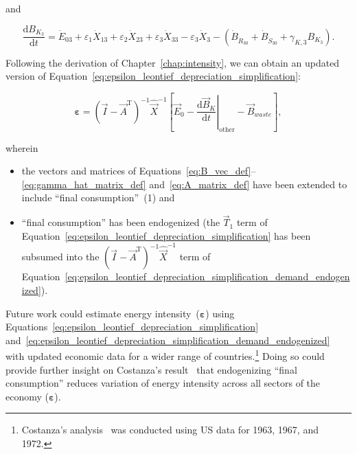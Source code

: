 \noindent{}and

\begin{equation} \label{eq:C-Total_Energy_Sec_3-unfinished}
	\frac{\mathrm{d}B_{K_{3}}}{\mathrm{d}t}
	= \dot{E}_{03}
	+ \varepsilon_{1} \dot{X}_{13}
	+ \varepsilon_{2} \dot{X}_{23}
	+ \varepsilon_{3} \dot{X}_{33}
	- \varepsilon_{3} \dot{X}_{3}
	- \left( \dot{B}_{\dot{R}_{30}} 
							+ \dot{B}_{\dot{S}_{30}}
							+ \gamma_{K,3} B_{K_{3}}
							\right).
\end{equation}

\noindent{}Following the derivation of Chapter~\ref{chap:intensity},
we can obtain an updated version 
of Equation~\ref{eq:epsilon_leontief_depreciation_simplification}:

\begin{equation} \label{eq:epsilon_leontief_depreciation_simplification_demand_endogenized}
	\boldsymbol{\varepsilon} 
	= {(\vec{I} - \vec{A}^{\mathrm{T}})}^{-1}\hat{\vec{X}}^{-1}
		\left[\vec{E}_{0} 
				- \left. \frac{\mathrm{d}\vec{B}_{K}}{\mathrm{d}t} \right|_{\mathrm{other}}
				- \vec{B}_{waste}
		\right],
\end{equation}

\noindent{}wherein 

\begin{itemize}
	\item{the vectors and matrices of Equations~\ref{eq:B_vec_def}--\ref{eq:gamma_hat_matrix_def}
	and~\ref{eq:A_matrix_def} have been extended to include ``final consumption''~(1) and}
	\item{ ``final consumption'' has been endogenized
	(the $\vec{T}_{1}$ term of Equation~\ref{eq:epsilon_leontief_depreciation_simplification}
	has been subsumed into the 
	${(\vec{I} - \vec{A}^{\mathrm{T}})}^{-1}\hat{\vec{X}}^{-1}$
	term of Equation~\ref{eq:epsilon_leontief_depreciation_simplification_demand_endogenized}).}
\end{itemize}

Future work could estimate energy intensity~($\boldsymbol{\varepsilon}$) 
using Equations~\ref{eq:epsilon_leontief_depreciation_simplification}
and~\ref{eq:epsilon_leontief_depreciation_simplification_demand_endogenized}
with updated economic data for a wider range of countries.\footnote{Costanza's
analysis~\cite{Costanza:1980ww} was conducted using US data for 1963, 1967, and 1972.}
Doing so could provide further insight on Costanza's result~\cite{Costanza:1980ww}
that endogenizing ``final consumption'' reduces variation 
of energy intensity across all sectors of the economy ($\boldsymbol{\varepsilon}$).


